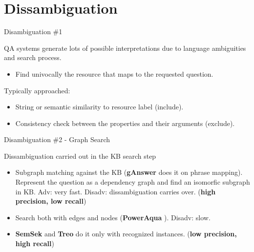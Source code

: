 \documentclass{beamer}
\begin{document}
\section{Dissambiguation}

\begin{frame}{Disambiguation \#1}
  \begin{card}
    QA systems generate lots of possible interpretations due to language ambiguities and search process.
    \begin{itemize}
      \item Find univocally the resource that maps to the requested question.
    \end{itemize}
  \end{card}
  \begin{card}
    Typically approached:
    \begin{itemize}
      \item String or semantic similarity to resource label (include).
      \item Consistency check between the properties and their arguments (exclude).
    \end{itemize}
  \end{card}
\end{frame}


\begin{frame}{Disambiguation \#2 - Graph Search}
  \begin{card}
    Dissambiguation carried out in the KB search step
    \begin{itemize}
      \item Subgraph matching against the KB (\textbf{gAnswer} \cite{zou2014a} does it on phrase mapping). Represent the question as a dependency graph and find an isomorfic subgraph in KB\@. Adv: very fast. Disadv: dissambiguation carries over. (\textbf{high precision, low recall})
      \item Search both with edges and nodes (\textbf{PowerAqua} \cite{lopez2012a}). Disadv: slow.
      \item \textbf{SemSek} \cite{aggarwal2012a} and \textbf{Treo} \cite{freitas2014a} do it only with recognized instances. (\textbf{low precision, high recall})
    \end{itemize}
  \end{card}
\end{frame}
\end{document}
